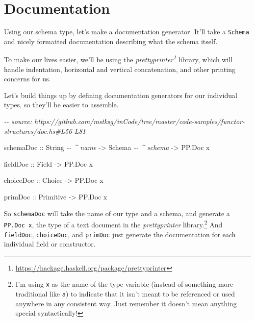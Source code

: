 \documentclass[]{article}
\newenvironment{Shaded}{}{}
\newcommand{\CommentTok}[1]{\textcolor[rgb]{0.38,0.63,0.69}{\textit{#1}}}
\newcommand{\DataTypeTok}[1]{\textcolor[rgb]{0.56,0.13,0.00}{#1}}
\newcommand{\NormalTok}[1]{#1}
\newcommand{\OtherTok}[1]{\textcolor[rgb]{0.00,0.44,0.13}{#1}}
\renewcommand{\href}[2]{#2\footnote{\url{#1}}}
\begin{document}
\hypertarget{documentation}{%
\section{Documentation}\label{documentation}}

Using our schema type, let's make a documentation generator. It'll take a
\texttt{Schema} and nicely formatted documentation describing what the schema
itself.

To make our lives easier, we'll be using the
\emph{\href{https://hackage.haskell.org/package/prettyprinter}{prettyprinter}}
library, which will handle indentation, horizontal and vertical concatenation,
and other printing concerns for us.

Let's build things up by defining documentation generators for our individual
types, so they'll be easier to assemble.

\begin{Shaded}
\begin{Highlighting}[]
\CommentTok{{-}{-} source: https://github.com/mstksg/inCode/tree/master/code{-}samples/functor{-}structures/doc.hs\#L56{-}L81}

\NormalTok{schemaDoc}
\OtherTok{    ::} \DataTypeTok{String}       \CommentTok{{-}{-} \^{} name}
    \OtherTok{{-}>} \DataTypeTok{Schema}       \CommentTok{{-}{-} \^{} schema}
    \OtherTok{{-}>} \DataTypeTok{PP.Doc}\NormalTok{ x}

\OtherTok{fieldDoc ::} \DataTypeTok{Field} \OtherTok{{-}>} \DataTypeTok{PP.Doc}\NormalTok{ x}

\OtherTok{choiceDoc ::} \DataTypeTok{Choice} \OtherTok{{-}>} \DataTypeTok{PP.Doc}\NormalTok{ x}

\OtherTok{primDoc ::} \DataTypeTok{Primitive} \OtherTok{{-}>} \DataTypeTok{PP.Doc}\NormalTok{ x}
\end{Highlighting}
\end{Shaded}

So \texttt{schemaDoc} will take the name of our type and a schema, and generate
a \texttt{PP.Doc\ x}, the type of a text document in the \emph{prettyprinter}
library.\footnote{I'm using \texttt{x} as the name of the type variable (instead
  of something more traditional like \texttt{a}) to indicate that it isn't meant
  to be referenced or used anywhere in any consistent way. Just remember it
  doesn't mean anything special syntactically!} And \texttt{fieldDoc},
\texttt{choiceDoc}, and \texttt{primDoc} just generate the documentation for
each individual field or constructor.
\end{document}
